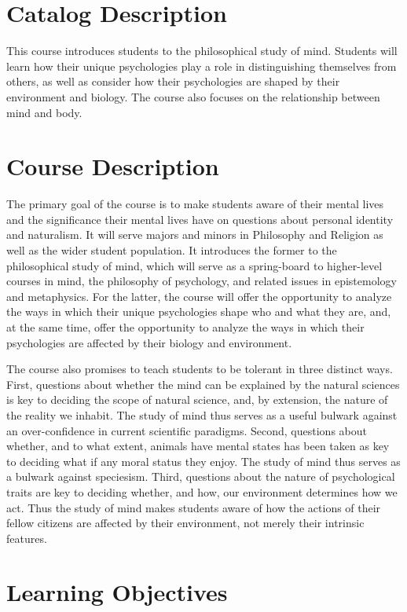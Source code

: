 \documentclass[article,oneside]{memoir}
\begin{document}
\section{Catalog Description}

This course introduces students to the philosophical study of mind. Students will learn how their unique psychologies play a role in distinguishing themselves from others, as well as consider how their psychologies are shaped by their environment and biology. The course also focuses on the relationship between mind and body.

\section{Course Description}

The primary goal of the course is to make students aware of their mental lives and the significance their mental lives have on questions about personal identity and naturalism. It will serve majors and minors in Philosophy and Religion as well as the wider student population. It introduces the former to the philosophical study of mind, which will serve as a spring-board to higher-level courses in mind, the philosophy of psychology, and related issues in epistemology and metaphysics. For the latter, the course will offer the opportunity to analyze the ways in which their unique psychologies shape who and what they are, and, at the same time, offer the opportunity to analyze the ways in which their psychologies are affected by their biology and environment. 

The course also promises to teach students to be tolerant in three distinct ways. First, questions about whether the mind can be explained by the natural sciences is key to deciding the scope of natural science, and, by extension, the nature of the reality we inhabit. The study of mind thus serves as a useful bulwark against an over-confidence in current scientific paradigms. Second, questions about whether, and to what extent, animals have mental states has been taken as key to deciding what if any moral status they enjoy. The study of mind thus serves as a bulwark against speciesism. Third, questions about the nature of psychological traits are key to deciding whether, and how, our environment determines how we act. Thus the study of mind makes students aware of how the actions of their fellow citizens are affected by their environment, not merely their intrinsic features. 

\section{Learning Objectives}
\end{document}
